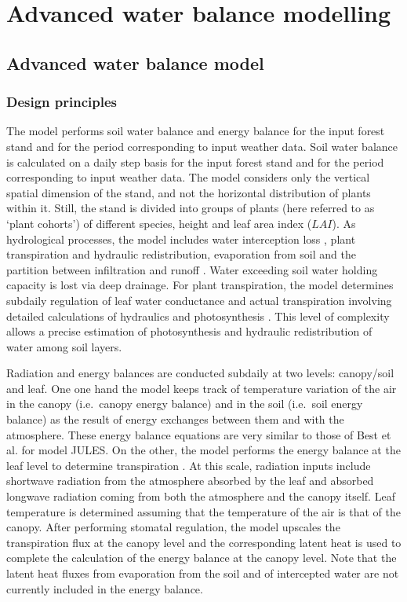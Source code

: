 \documentclass[]{book}
\begin{document}
\part{Advanced water balance
modelling}\label{part-advanced-water-balance-modelling}

\chapter{Advanced water balance model}\label{advancedwaterbalance}

\section{Design principles}\label{design-principles-1}

The model performs soil water balance and energy balance for the input
forest stand and for the period corresponding to input weather data.
Soil water balance is calculated on a daily step basis for the input
forest stand and for the period corresponding to input weather data. The
model considers only the vertical spatial dimension of the stand, and
not the horizontal distribution of plants within it. Still, the stand is
divided into groups of plants (here referred to as `plant cohorts') of
different species, height and leaf area index (\(LAI\)). As hydrological
processes, the model includes water interception loss \citep{Gash1995},
plant transpiration and hydraulic redistribution, evaporation from soil
\citep{Ritchie1972} and the partition between infiltration and runoff
\citep{Boughton1989}. Water exceeding soil water holding capacity is
lost via deep drainage. For plant transpiration, the model determines
subdaily regulation of leaf water conductance and actual transpiration
involving detailed calculations of hydraulics and photosynthesis
\citep{Sperry2016}. This level of complexity allows a precise estimation
of photosynthesis and hydraulic redistribution of water among soil
layers.

Radiation and energy balances are conducted subdaily at two levels:
canopy/soil and leaf. One one hand the model keeps track of temperature
variation of the air in the canopy (i.e.~canopy energy balance) and in
the soil (i.e.~soil energy balance) as the result of energy exchanges
between them and with the atmosphere. These energy balance equations are
very similar to those of Best et al. \citeyearpar{Best2011} for model
JULES. On the other, the model performs the energy balance at the leaf
level to determine transpiration \citep{Sperry2016}. At this scale,
radiation inputs include shortwave radiation from the atmosphere
absorbed by the leaf and absorbed longwave radiation coming from both
the atmosphere and the canopy itself. Leaf temperature is determined
assuming that the temperature of the air is that of the canopy. After
performing stomatal regulation, the model upscales the transpiration
flux at the canopy level and the corresponding latent heat is used to
complete the calculation of the energy balance at the canopy level. Note
that the latent heat fluxes from evaporation from the soil and of
intercepted water are not currently included in the energy balance.
\end{document}
